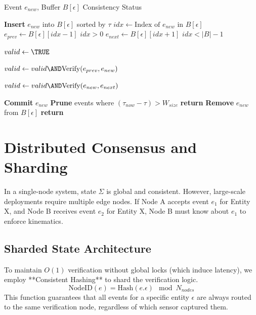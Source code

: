\documentclass[conference]{IEEEtran}
\providecommand{\RETURN}{\STATE \textbf{return} }
\begin{document}
\begin{algorithm}[h]
\caption{Out-of-Order Buffer Verification}
\begin{algorithmic}[1]
\REQUIRE Event $e_{new}$, Buffer $B[\epsilon]$
\ENSURE Consistency Status

\STATE \textbf{Insert} $e_{new}$ into $B[\epsilon]$ sorted by $\tau$
\STATE $idx \leftarrow \text{Index of } e_{new} \text{ in } B[\epsilon]$
\STATE $e_{prev} \leftarrow B[\epsilon][idx - 1]$ \IF $idx > 0$
\STATE $e_{next} \leftarrow B[\epsilon][idx + 1]$ \IF $idx < |B|-1$

\STATE $valid \leftarrow \TRUE$

    \STATE $valid \leftarrow valid \AND \text{Verify}(e_{prev}, e_{new})$
\ENDIF

    \STATE $valid \leftarrow valid \AND \text{Verify}(e_{new}, e_{next})$
\ENDIF

    \STATE \textbf{Commit} $e_{new}$
    \STATE \textbf{Prune} events where $(\tau_{now} - \tau) > W_{size}$
    \RETURN \TRUE
\ELSE
    \STATE \textbf{Remove} $e_{new}$ from $B[\epsilon]$
    \RETURN \FALSE
\ENDIF
\end{algorithmic}
\label{alg:buffer}
\end{algorithm}

\section{Distributed Consensus and Sharding}

In a single-node system, state $\Sigma$ is global and consistent. However, large-scale deployments require multiple edge nodes. If Node A accepts event $e_1$ for Entity X, and Node B receives event $e_2$ for Entity X, Node B must know about $e_1$ to enforce kinematics.

\subsection{Sharded State Architecture}

To maintain $O(1)$ verification without global locks (which induce latency), we employ **Consistent Hashing** to shard the verification logic.
\begin{equation}
    \text{NodeID}(e) = \text{Hash}(e.\epsilon) \mod N_{nodes}
\end{equation}
This function guarantees that all events for a specific entity $\epsilon$ are always routed to the same verification node, regardless of which sensor captured them.
\end{document}
